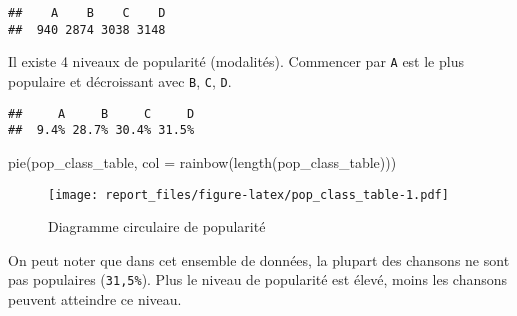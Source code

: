 \documentclass[
  12pt,
]{article}
\newenvironment{Shaded}{\begin{snugshade}}{\end{snugshade}}
\newcommand{\AttributeTok}[1]{\textcolor[rgb]{0.77,0.63,0.00}{#1}}
\newcommand{\ConstantTok}[1]{\textcolor[rgb]{0.00,0.00,0.00}{#1}}
\newcommand{\FunctionTok}[1]{\textcolor[rgb]{0.00,0.00,0.00}{#1}}
\newcommand{\NormalTok}[1]{#1}
\newcommand{\OtherTok}[1]{\textcolor[rgb]{0.56,0.35,0.01}{#1}}
\newcommand{\SpecialCharTok}[1]{\textcolor[rgb]{0.00,0.00,0.00}{#1}}
\begin{document}
\begin{verbatim}
##    A    B    C    D 
##  940 2874 3038 3148
\end{verbatim}

Il existe 4 niveaux de popularité (modalités). Commencer par \texttt{A}
est le plus populaire et décroissant avec \texttt{B}, \texttt{C},
\texttt{D}.

\begin{Shaded}
\end{Shaded}

\begin{verbatim}
##     A     B     C     D 
##  9.4% 28.7% 30.4% 31.5%
\end{verbatim}

\begin{Shaded}
\begin{Highlighting}[]
\FunctionTok{pie}\NormalTok{(pop\_class\_table, }\AttributeTok{col =} \FunctionTok{rainbow}\NormalTok{(}\FunctionTok{length}\NormalTok{(pop\_class\_table)))}
\end{Highlighting}
\end{Shaded}

\begin{figure}
\centering
\texttt{[image: report\_files/figure-latex/pop\_class\_table-1.pdf]}
\caption{Diagramme circulaire de popularité}
\end{figure}

On peut noter que dans cet ensemble de données, la plupart des chansons
ne sont pas populaires (\texttt{31,5\%}). Plus le niveau de popularité
est élevé, moins les chansons peuvent atteindre ce niveau.
\end{document}
